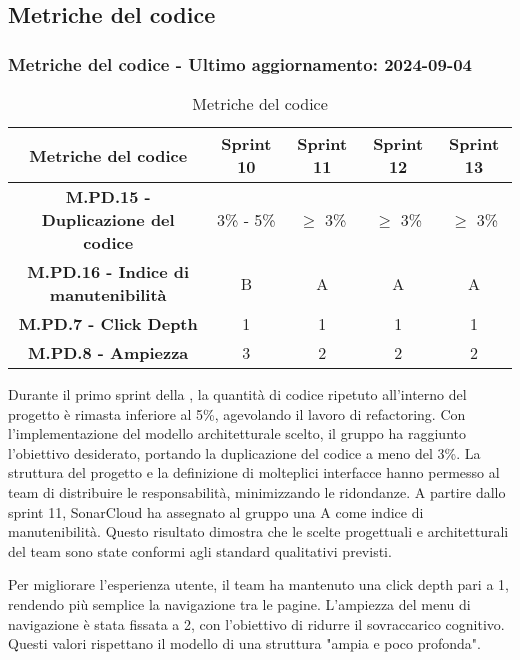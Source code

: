 \subsection{Metriche del codice}

\subsubsection*{Metriche del codice - Ultimo aggiornamento: 2024-09-04}

\begin{table}[H]
  \centering
  \begin{tabular}{|c|c|c|c|c|}
      \hline
      Metriche del codice & \textbf{Sprint 10} & \textbf{Sprint 11} & \textbf{Sprint 12}  & \textbf{Sprint 13} \\
      \hline
      \textbf{M.PD.15 - Duplicazione del codice} & 3\% - 5\% & $\ge$ 3\% & $\ge$ 3\% & $\ge$ 3\% \\
      \hline
      \textbf{M.PD.16 - Indice di manutenibilità} & B & A & A & A \\
      \hline
      \textbf{M.PD.7 - Click Depth} & 1 & 1 & 1 & 1 \\
      \hline
      \textbf{M.PD.8 - Ampiezza} & 3 & 2 & 2 & 2 \\
      \hline
  \end{tabular}
  \caption{Metriche del codice}
\end{table}

\par Durante il primo sprint della , la quantità di codice ripetuto all'interno del progetto è rimasta inferiore al 5\%, agevolando il lavoro di refactoring. Con l'implementazione del modello architetturale scelto, il gruppo ha raggiunto l'obiettivo desiderato, portando la duplicazione del codice a meno del 3\%. La struttura del progetto e la definizione di molteplici interfacce hanno permesso al team di distribuire le responsabilità, minimizzando le ridondanze. A partire dallo sprint 11, SonarCloud ha assegnato al gruppo una A come indice di manutenibilità. Questo risultato dimostra che le scelte progettuali e architetturali del team sono state conformi agli standard qualitativi previsti.

\par Per migliorare l'esperienza utente, il team ha mantenuto una click depth pari a 1, rendendo più semplice la navigazione tra le pagine. L'ampiezza del menu di navigazione è stata fissata a 2, con l'obiettivo di ridurre il sovraccarico cognitivo. Questi valori rispettano il modello di una struttura "ampia e poco profonda".